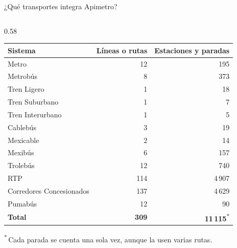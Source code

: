 \begin{frame}{¿Qué transportes integra Apimetro?}
  \begin{columns}[c]
    \begin{column}{0.58\textwidth}
      \centering\scriptsize
      \begin{tabular}{@{}lrr@{}}
        \toprule
        \textbf{Sistema} & \textbf{Líneas o rutas} & \textbf{Estaciones y paradas} \\
        \midrule
        Metro                    &   12 &     195 \\
        Metrobús                 &    8 &     373 \\
        Tren Ligero              &    1 &      18 \\
        Tren Suburbano           &    1 &       7 \\
        Tren Interurbano         &    1 &       5 \\
        Cablebús                 &    3 &      19 \\
        Mexicable                &    2 &      14 \\
        Mexibús                  &    6 &     157 \\
        Trolebús                 &   12 &     740 \\
        RTP                      &  114 & 4\,907 \\
        Corredores Concesionados &  137 & 4\,629 \\
        Pumabús                  &   12 &      90 \\
        \midrule
        \textbf{Total}           & \textbf{309} & \textbf{11\,115}\textsuperscript{*} \\
        \bottomrule
      \end{tabular}

      {\tiny\textsuperscript{*}\,Cada parada se cuenta una sola vez, aunque la usen varias rutas.}


\end{column}
\end{columns}
\end{frame}
